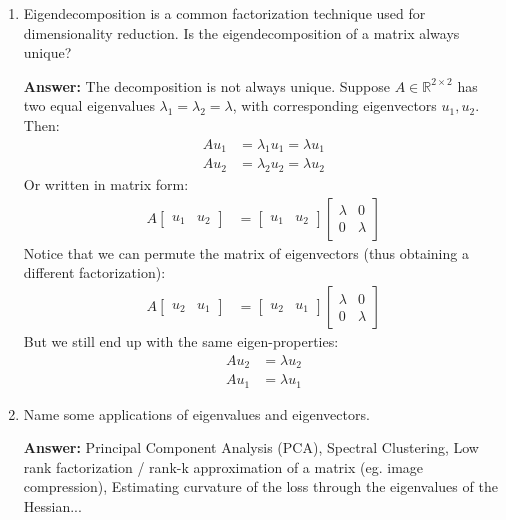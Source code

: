 \documentclass{article}
\newenvironment{QandA}{\begin{enumerate}[label=\arabic*.]}{\end{enumerate}}
\newenvironment{answer}{\par\normalfont \textbf{Answer:}}{}
\newcommand{\R}{\mathbb{R}}
\begin{document}
\begin{QandA}
    \item Eigendecomposition is a common factorization technique used for dimensionality reduction. Is the eigendecomposition of a matrix always unique?
    \begin{answer}
        The decomposition is not always unique. Suppose $A \in \R^{2 \times 2}$ has two equal eigenvalues $\lambda_1 = \lambda_2 = \lambda$, with corresponding eigenvectors $u_1, u_2$. Then:
        \begin{align*}
            A u_1 &= \lambda_1 u_1 = \lambda u_1 \\
            A u_2 &= \lambda_2 u_2 = \lambda u_2
        \end{align*}
        Or written in matrix form:
        \begin{align*}
            A \begin{bmatrix}
                u_1 & u_2
            \end{bmatrix}
             &= \begin{bmatrix}
                u_1 & u_2
            \end{bmatrix} 
            \begin{bmatrix}
                \lambda & 0 \\
                0 & \lambda
            \end{bmatrix}
        \end{align*}
        Notice that we can permute the matrix of eigenvectors (thus obtaining a different factorization):
        \begin{align*}
            A \begin{bmatrix}
                u_2 & u_1
            \end{bmatrix}
             &= \begin{bmatrix}
                u_2 & u_1
            \end{bmatrix} 
            \begin{bmatrix}
                \lambda & 0 \\
                0 & \lambda
            \end{bmatrix}
        \end{align*}
        But we still end up with the same eigen-properties:
        \begin{align*}
            A u_2 &= \lambda u_2 \\
            A u_1 &= \lambda u_1
        \end{align*}
    \end{answer}
    \item Name some applications of eigenvalues and eigenvectors.
    \begin{answer}
        Principal Component Analysis (PCA), Spectral Clustering, Low rank factorization / rank-k approximation of a matrix (eg. image compression), Estimating curvature of the loss through the eigenvalues of the Hessian... 
    \end{answer}


\end{QandA}
\end{document}
